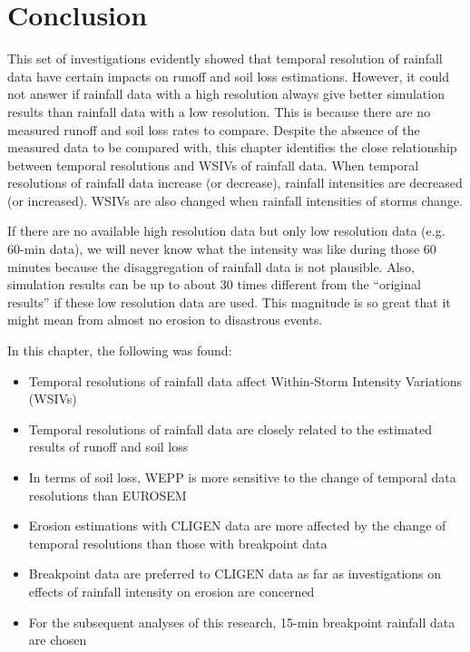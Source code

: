 \section{Conclusion}
\label{sec:TemporalScalesConclusion}

This set of investigations evidently showed that temporal resolution of rainfall
data have certain impacts on runoff and soil loss estimations. However, it could
not answer if rainfall data with a high resolution always give better simulation
results than rainfall data with a low resolution. This is because there are no
measured runoff and soil loss rates to compare. Despite the absence of the
measured data to be compared with, this chapter identifies the close
relationship between temporal resolutions and WSIVs of rainfall data. When
temporal resolutions of rainfall data increase (or decrease), rainfall
intensities are decreased (or increased). WSIVs are also changed when rainfall
intensities of storms change.

If there are no available high resolution data but only low resolution data
(e.g. 60-min data), we will never know what the intensity was like during those
60 minutes because the disaggregation of rainfall data is not plausible. Also,
simulation results can be up to about 30 times different from the ``original
results'' if these low resolution data are used. This magnitude is so great that
it might mean from almost no erosion to disastrous events.

In this chapter, the following was found:
\begin{itemize}
  \item Temporal resolutions of rainfall data affect Within-Storm Intensity
Variations (WSIVs)
  \item Temporal resolutions of rainfall data are closely related to the
estimated
results of runoff and soil loss
  \item In terms of soil loss, WEPP is more sensitive to the change of temporal
data resolutions than EUROSEM
  \item Erosion estimations with CLIGEN data are more affected by the change of
temporal resolutions than those with breakpoint data
  \item Breakpoint data are preferred to CLIGEN data as far as investigations
on effects of rainfall intensity on erosion are concerned
  \item For the subsequent analyses of this research, 15-min breakpoint rainfall
data are chosen
\end{itemize}


